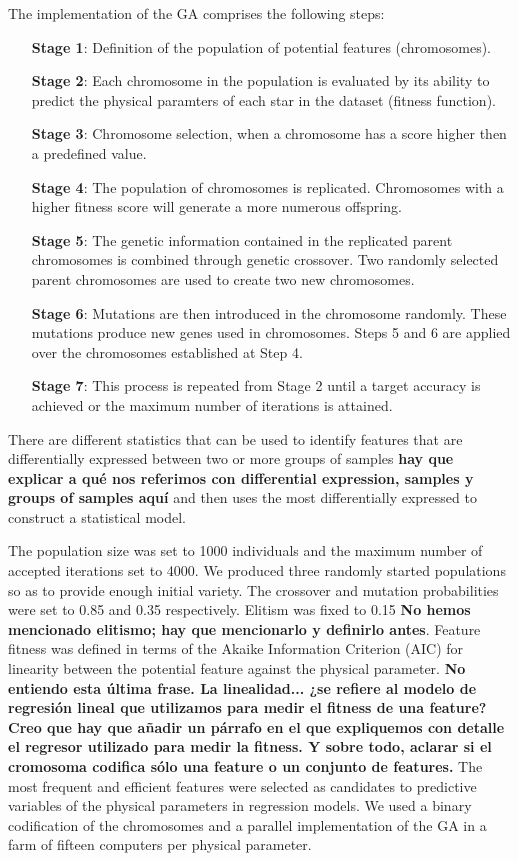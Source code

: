 {The implementation of the GA comprises the following steps:

\begin{itemize}
\item [\textbf{Stage 1}:]{Definition of the population of potential features (chromosomes).}
\item [\textbf{Stage 2}:]{Each chromosome in the population is evaluated by its ability to
predict the physical paramters of each star in the dataset (fitness
function).}
\item [\textbf{Stage 3}:]{Chromosome selection, when a chromosome has 
 a score higher then a predefined value.}
\item [\textbf{Stage 4}:]{The population of chromosomes is replicated. 
 Chromosomes with a higher fitness score will generate a more numerous
 offspring.}
\item [\textbf{Stage 5}:]{The genetic information contained in the replicated parent
chromosomes is combined through genetic crossover. Two randomly
selected parent chromosomes are used to create two new chromosomes.}
\item [\textbf{Stage 6}:]{Mutations are then introduced in the chromosome randomly. 
 These mutations produce new genes used in chromosomes.  Steps 5 and 6
 are applied over the chromosomes established at Step 4.}
\item [\textbf{Stage 7}:]{This process is repeated from Stage 2 until 
  a target accuracy is achieved or the maximum number of iterations is
  attained.}
\end{itemize}

There are different statistics that can be used to identify features
that are differentially expressed between two or more groups of
samples {\bf hay que explicar a qué nos referimos con differential
expression, samples y groups of samples aquí} and then uses the most
differentially expressed to construct a statistical model.

The population size was set to 1000 individuals and the maximum number
of accepted iterations set to 4000. We produced three randomly started
populations so as to provide enough initial variety. The crossover and
mutation probabilities were set to 0.85 and 0.35 respectively. Elitism
was fixed to 0.15 {\bf No hemos mencionado elitismo; hay que
mencionarlo y definirlo antes}.  Feature fitness was defined in terms
of the Akaike Information Criterion (AIC) for linearity between the
potential feature against the physical parameter. {\bf No entiendo
esta última frase. La linealidad... ¿se refiere al modelo de regresión
lineal que utilizamos para medir el fitness de una feature? Creo que
hay que añadir un párrafo en el que expliquemos con detalle el
regresor utilizado para medir la fitness. Y sobre todo, aclarar si el
cromosoma codifica sólo una feature o un conjunto de features.} The
most frequent and efficient features were selected as candidates to
predictive variables of the physical parameters in regression
models. We used a binary codification of the chromosomes and a
parallel implementation of the GA in a farm of fifteen computers per
physical parameter.

}
